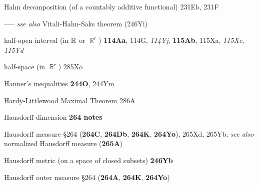 \indexmedskip






















Hahn decomposition (of a countably additive functional)
231Eb, 231F


----- {\it see also} Vitali-Hahn-Saks theorem (246Yi)














half-open interval (in $\Bbb R$ or $\BbbR^r$) {\bf 114Aa}, 114G,
{\it 114Yj}, {\bf 115Ab}, 115Xa, {\it 115Xc}, {\it 115Yd}

half-space (in $\BbbR^r$) 285Xo


















Hanner's inequalities {\bf 244O}, 244Ym




Hardy-Littlewood Maximal Theorem 286A














Hausdorff dimension {\bf 264 notes}






Hausdorff measure \S264
({\bf 264C}, {\bf 264Db}, {\bf 264K}, {\bf 264Yo}),
265Xd, 265Yb; 
  {\it see also} normalized Hausdorff measure ({\bf 265A})


Hausdorff metric (on a space of closed subsets) {\bf 246Yb}


Hausdorff outer measure \S264 ({\bf 264A}, {\bf 264K}, {\bf 264Yo})






